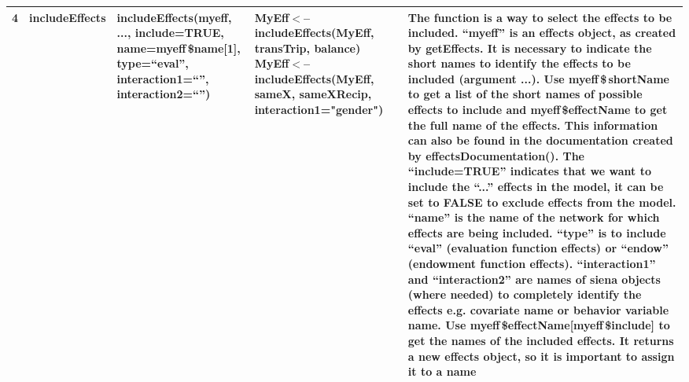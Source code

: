 \documentclass[a4paper,fleqn,11pt]{article}
\newcommand{\+}{\, + \,}
\begin{document}
{\begin{landscape}
\begin{small}
\begin{longtable}{c | p{2.4cm} | p{4.5cm} | p{4.0cm} | p{9.0cm} }
4 & includeEffects & includeEffects(myeff, ..., \newline include=TRUE, \newline
name=myeff{\,\$}name[1], type=``eval'', \newline
interaction1=``'',\newline
interaction2=``'') & {MyEff$<$--includeEffects(MyEff, transTrip, balance)
\flushleft MyEff$<$--includeEffects(MyEff, sameX, \newline
sameXRecip, \newline
interaction1="gender")}
 &The function is a
way to select the effects to be included. ``myeff'' is an effects object, as
created by getEffects. It is necessary to indicate the short names to identify
the effects to be included (argument ...).
Use myeff{\,\$\,}shortName to get a list
of the short names of possible effects to include and myeff{\,\$}effectName to get
the full name of the effects. This information can also be found in the
documentation created by effectsDocumentation(). The ``include=TRUE'' indicates
that we want to include the ``...'' effects in the model, it can be set to
FALSE to exclude effects from the model. ``name'' is the name of the network
for which effects are being included. ``type'' is to include ``eval''
(evaluation function effects) or ``endow'' (endowment function effects).
``interaction1'' and ``interaction2'' are names of siena objects (where needed)
to completely identify the effects e.g. covariate name or behavior variable
name. Use myeff{\,\$}effectName[myeff{\,\$}include]
to get the names of the included
effects. It returns a new effects object, so it is important to assign it to a
name\\
\hline


\end{longtable}
\end{small}
\end{landscape}}
\end{document}
